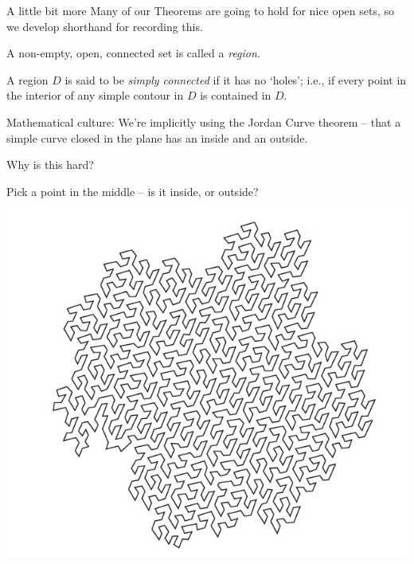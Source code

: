 \documentclass{beamer}
\begin{document}
\begin{frame}{A little bit more}
Many of our Theorems are going to hold for nice open sets, so we develop shorthand for recording this.
\begin{definition}[4.4 in notes]
A non-empty, open, connected set is called a \emph{region}.
\end{definition}
\begin{definition}[4.5 in notes]
A region $D$ is said to be \emph{simply connected} if it has no `holes'; i.e., if every point in the interior of any simple contour in $D$ is contained in $D$.
\end{definition}
\begin{block}{Mathematical culture:}
We're implicitly using the Jordan Curve theorem -- that a simple curve closed in the plane has an inside and an outside.  
\end{block}
\begin{block}{Why is this hard?}
\end{block}
\end{frame}

\begin{frame}{Pick a point in the middle -- is it inside, or outside?}
\includegraphics[width=\textwidth,height=0.8\textheight,keepaspectratio]{JordanCurveHard.png}

\end{frame}
\end{document}
